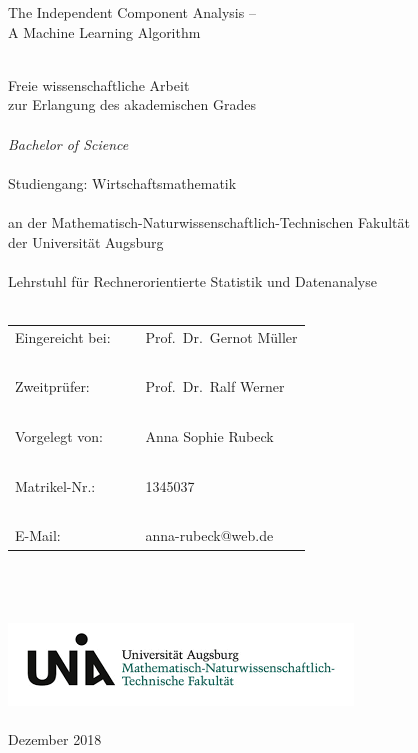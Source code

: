 \documentclass[12pt, a4paper]{article}
\numberwithin{equation}{section}
\numberwithin{figure}{section}
\numberwithin{table}{section}
\begin{document}
	
	\thispagestyle{plain}
	\hrulefill
	\vspace*{0.5cm}
	\begin{center}
		{\huge{The Independent Component Analysis --\\[0.5em]
		 A Machine Learning Algorithm}}
	\end{center}
	\hrulefill
	\begin{center}
		~\\
		Freie wissenschaftliche Arbeit\\
	
		zur Erlangung des akademischen Grades\\
		~\\
		\textit{Bachelor of Science}\\
		~\\
		Studiengang: Wirtschaftsmathematik\\
		~\\
		an der Mathematisch-Naturwissenschaftlich-Technischen Fakultät\\
		der Universität Augsburg\\
		~\\
		Lehrstuhl für Rechnerorientierte Statistik und Datenanalyse\\~\\
		\begin{tabular}{lll}
			Eingereicht bei: & ~ &Prof.~Dr.~Gernot Müller\\ ~&~\\
			Zweitprüfer: & ~ &Prof.~Dr.~Ralf Werner\\~&~\\
			Vorgelegt von: & ~ & Anna Sophie Rubeck\\~&~\\
			
			Matrikel-Nr.: & ~&1345037\\~&~&~\\
			E-Mail: & ~ &anna-rubeck@web.de
		\end{tabular} \\~\\~\\
		\includegraphics{logo-uni}
		~\\~\\
		Dezember 2018
	\end{center}
	
\end{document}
